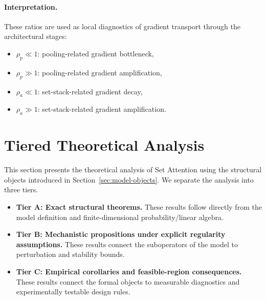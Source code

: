 \documentclass{article}
\theoremstyle{plain}
\theoremstyle{definition}
\theoremstyle{remark}
\begin{document}
\paragraph{Interpretation.}
These ratios are used as local diagnostics of gradient transport through the architectural stages:
\begin{itemize}
    \item $\rho_p\ll 1$: pooling-related gradient bottleneck,
    \item $\rho_p\gg 1$: pooling-related gradient amplification,
    \item $\rho_a\ll 1$: set-stack-related gradient decay,
    \item $\rho_a\gg 1$: set-stack-related gradient amplification.
\end{itemize}






\section{Tiered Theoretical Analysis}
\label{sec:theory}

This section presents the theoretical analysis of Set Attention using the structural objects introduced in Section~\ref{sec:model-objects}. We separate the analysis into three tiers.

\begin{itemize}
    \item \textbf{Tier A: Exact structural theorems.} These results follow directly from the model definition and finite-dimensional probability/linear algebra.
    \item \textbf{Tier B: Mechanistic propositions under explicit regularity assumptions.} These results connect the suboperators of the model to perturbation and stability bounds.
    \item \textbf{Tier C: Empirical corollaries and feasible-region consequences.} These results connect the formal objects to measurable diagnostics and experimentally testable design rules.
\end{itemize}
\end{document}
